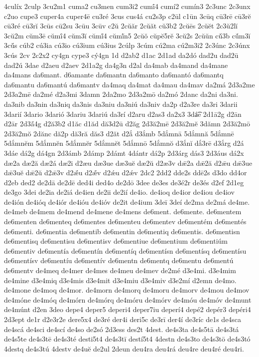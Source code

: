 {4culíx
2culp
3cu2m1
cuma2
cu3men
cum3i2
cumī́4
cumí2
cumín3
2c3unc
2c3unx
c2uo
cupe3
cuper4a
cuper4ē
cu3ré
3cus
cus4á
cu2s3p
c2ūl
c1ūn
3cūq
cū3rē
cū3rĕ
cū3ré
cū3rĭ
3cūs
cū2su
3cūu
3cūv
c2ŭ
2cŭăr
2cŭăt
cŭ3b2
2cŭēs
2cŭĕt
2c3ŭ2lĭ
3cŭ2m
cŭm3ē
cŭmī́4
cŭm3ĭ
cŭmĭ́4
cŭmĭ́n5
2cŭŏ
cŭpĕ5rĕ
3cŭ2s
2cŭŭn
cŭ́3b
cŭ́m3ĭ
3cŭ́s
cúb2
cú3ia
cú3io
cú3ium
cú3ius
2cúlp
3cúm
cú2ma
cú2m3i2
2c3únc
2c3únx
3cús
2cv
2c2x2
cy4gn
cype3
cý4gn
1d
d2ab2
d1ac
2d1ad
da2dó
dad2u
dad2ū
dad2ú
3dae
d2aeu
d2aev
2d1a2g
da4g3n
d2al
da4mab
da4mand
da4mane
da4mans
da6mant.
d6amante
da6mantn
da6manto
da6mantó
da6mantq
da6mantu
da6mantú
da6mantv
da4maq
da4mat
da4mau
da4mav
da2má
2d3a2me
2d3a2mē
da2mé
d2a3mi
3damn
2da2mo
2d3a2mō
da2mó
2danc
da2ni
da3ni.
da3nib
da3nin
da3niq
da3nis
da3niu
da3niú
da3niv
da2p
d2a3re
da3ri
3darii
3darií
3dario
3darió
3dariu
3dariú
da3rí
d2aru
d2as3
da2x3
3dá͡e
2d1ā2g
d2ān
d2ār
2d3ā́4g
d2ă3b2
d1ăc
d1ăd
dă3d2ū
d2ăg
2d3ă2mē
2d3ă2mĕ
3dămn
2d3ă2mō
2d3ă2mŏ
2dănc
dă2p
dă3ră
dăs3
d2ăt
d2ắ
d3ắmb
5dắmnā
5dắmnă
5dắmnē
5dắmnĕm
5dắmnĕn
5dắmnĕr
5dắmnĕt
5dắmnō
5dắmnŏ
d3ắnĭ
dắ3rē
d3ắrg
d2á
3dáe
dá2g
dá4gn
2d3ámb
2dámp
2dámt
4dántr
dá2p
2d3árg
dás3
2d3áus
dá2x
dæ2a
dæ2ă
dæ2á
dæ2i
d2æu
dæ3ue
dæ3uĕ
dæ2ŭ
d2æ3v
dǣ2a
dǣ2ă
d2ǣu
dǣ3ue
dǣ3uĕ
dǣ2ŭ
d2ǣ3v
d2ǣ́u
d2ǣ́v
d2ǽu
d2ǽv
2dc2
2dd2
dde2s
ddē2s
d3do
dd4or
d2eb
ded2
de2dā
de2dē
ded4i
ded4o
de2dō
3dee
de3es
de3é2r
de3és
d2ef
2d1eg
de3go
3dei
de2ia
de2iá
de4ien
de2ii
de2ií
de4io.
de4ioq
de4ior
de4iou
de4iov
de4ión
de4ióq
de4iór
de4ióu
de4ióv
de2it
de4ium
3deī
3deí
de2ma
de2má
de4me.
de4meb
de4mem
de4mend
de4mene
de4mens
de6ment.
de6mente.
de6mentem
de6menten
de6menteq
de6mentes
de6menteu
de6mentev
de6mentém
de6mentés
de6menti.
de6mentia
de6mentib
de6mentin
de6mentiq
de6mentis.
de6mentisn
de6mentisq
de6mentisu
de6mentisv
de6mentiue
de6mentium
de6mentiúm
de6mentiv
de6mentía
de6mentín
de6mentíq
de6mentísn
de6mentísq
de6mentísu
de6mentísv
de6mentíu
de6mentív
de6mentn
de6mentq
de6mentu
de6mentú
de6mentv
de4meq
de4mer
de4mes
de4meu
de4mev
de2mé
d3e4mi.
d3e4mim
de4mine
d3e4miq
d3e4mis
d3e4mit
d3e4miu
d3e4miv
d3e2mí
d2emn
de4mo.
de4mone
de4moq
de4mor.
de4morn
de4morq
de4moru
de4morv
de4mou
de4mov
de4móne
de4móq
de4mórn
de4mórq
de4móru
de4mórv
de4móu
de4móv
de4munt
de4múnt
d2en
3deo
depe4
deper5
deperi4
deper7iu
deperí4
depé2
depér3
depéri4
2d3ept
de1r
d2e3r2e
dere5x4
de3ré
der4i
deri5c
de3rī
der4í
de3ríc
de1s
de4sca
de4scá
de4sci
de4scí
de4so
de2só
2d3ess
des2t
4dest.
de4s3ta
de4s5tā
de4s3tá
de4s5te
de4s3tē
de4s3té
desti5t4
de4s3tī
destí5t4
4destn
de4s3to
de4s3tō
de4s3tó
4destq
de4s3tú
4destv
de4uĕ
de2ul
2deun
deu4ra
deu4rá
deu4re
deu4ré
deu4ri.
}
